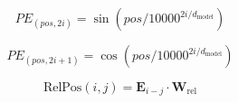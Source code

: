 \begin{equation}\label{eq:pos_enc_sin}
PE_{(pos,2i)} = \sin(pos/10000^{2i/d_{\text{model}}})
\end{equation}

\begin{equation}\label{eq:pos_enc_cos}
PE_{(pos,2i+1)} = \cos(pos/10000^{2i/d_{\text{model}}})
\end{equation}

\begin{equation}\label{eq:rel_pos_enc}
\text{RelPos}(i,j) = \mathbf{E}_{i-j} \cdot \mathbf{W}_{\text{rel}}
\end{equation}
